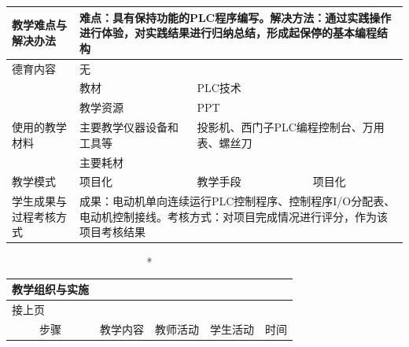 {\begin{longtable}{|m{20mm}|m{20mm}|m{20mm}|m{20mm}|m{20mm}|m{28mm}|}
\hline
\centering 教学难点与解决办法 &\multicolumn{5}{m{108mm}|}{难点：具有保持功能的PLC程序编写。解决方法：通过实践操作进行体验，对实践结果进行归纳总结，形成起保停的基本编程结构}\\
\hline
\centering 德育内容 &\multicolumn{5}{m{108mm}|}{无}\\
\hline
 &教材 & \multicolumn{4}{l|}{PLC技术}\\
\cline{2-6}& 教学资源 &\multicolumn{4}{m{88mm}|}{PPT}\\
\cline{2-6}\centering 使用的教学材料& 主要教学仪器设备和工具等 &\multicolumn{4}{m{88mm}|}{投影机、西门子PLC编程控制台、万用表、螺丝刀}\\
\cline{2-6}& 主要耗材 &\multicolumn{4}{m{88mm}|}{\qquad}\\
\hline
\centering 教学模式 &\multicolumn{2}{l|}{项目化}&\centering 教学手段 &\multicolumn{2}{l|}{项目化}\\
\hline
\centering 学生成果与过程考核方式 &\multicolumn{5}{m{108mm}|}{成果：电动机单向连续运行PLC控制程序、控制程序I/O分配表、电动机控制接线。考核方式：对项目完成情况进行评分，作为该项目考核结果}
\end{longtable}
\clearpage


\begin{landscape}
\begin{longtable}{|m{10mm}|m{50mm}|m{50mm}|m{50mm}|m{15mm}|}
\caption*{\huge 教学组织与实施}\\
\hline
\endfirsthead
\multicolumn{5}{l}{\small 接上页}\\
\hline
\multicolumn{1}{|c|}{步骤}&\multicolumn{1}{c|}{教学内容}&\multicolumn{1}{c|}{教师活动}&\multicolumn{1}{c|}{学生活动}&\multicolumn{1}{c|}{时间}\\
\hline
\endhead


\end{longtable}
\end{landscape}}
